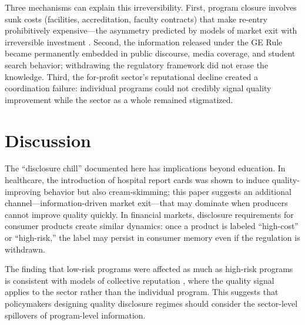 \documentclass[12pt]{article}
\begin{document}
Three mechanisms can explain this irreversibility. First, program closure involves sunk costs (facilities, accreditation, faculty contracts) that make re-entry prohibitively expensive---the asymmetry predicted by models of market exit with irreversible investment \citep{stevenson_wolfers2006}. Second, the information released under the GE Rule became permanently embedded in public discourse, media coverage, and student search behavior; withdrawing the regulatory framework did not erase the knowledge. Third, the for-profit sector's reputational decline created a coordination failure: individual programs could not credibly signal quality improvement while the sector as a whole remained stigmatized.

\section{Discussion}

The ``disclosure chill'' documented here has implications beyond education. In healthcare, the introduction of hospital report cards \citep{dranove_kessler_mcclellan_satterthwaite2003} was shown to induce quality-improving behavior but also cream-skimming; this paper suggests an additional channel---information-driven market exit---that may dominate when producers cannot improve quality quickly. In financial markets, disclosure requirements for consumer products create similar dynamics: once a product is labeled ``high-cost'' or ``high-risk,'' the label may persist in consumer memory even if the regulation is withdrawn.

The finding that low-risk programs were affected as much as high-risk programs is consistent with models of collective reputation \citep{deming_yuchtman_abulafi_goldin_katz2016}, where the quality signal applies to the sector rather than the individual program. This suggests that policymakers designing quality disclosure regimes should consider the sector-level spillovers of program-level information.
\end{document}
